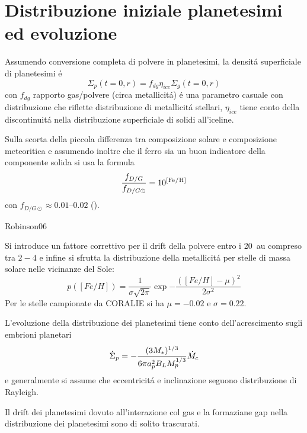 \section{Distribuzione iniziale planetesimi ed evoluzione}

Assumendo conversione completa di polvere in planetesimi, la densit\'a superficiale di planetesimi \'e
\begin{equation}
\Sigma_p(t=0,r)=f_{dg}\eta_{ice}\Sigma_g(t=0,r)
\end{equation}
con $f_{dg}$ rapporto gas/polvere (circa metallicit\'a) \'e una parametro casuale con distribuzione che riflette distribuzione di metallicit\'a stellari, $\eta_{ice}$ tiene conto della discontinuit\'a nella distribuzione superficiale di solidi all'iceline.

Sulla scorta della piccola differenza tra composizione solare e composizione meteoritica e assumendo inoltre che il ferro sia un buon indicatore della componente solida  si usa la formula
\begin{equation}
\frac{f_{D/G}}{f_{D/G\odot}}=10\expy{[\cel{Fe}{}{}{}/\cel{H}{}{}{}]}
\end{equation}
con $f_{D/G\odot}\approx\numrange{0.01}{0.02}$ (\cite{lodders2003solar}).

\begin{workout}
Robinson06
\end{workout}

Si introduce un fattore correttivo per il drift della polvere entro i \SI{20}{\astronomicalunit} compreso tra $2-4$ e infine si sfrutta la distribuzione della metallicit\'a per stelle di massa solare nelle vicinanze del Sole:
\begin{equation}
p([Fe/H])=\frac{1}{\sigma\sqrt{2\pi}}\exp{-\frac{([Fe/H]-\mu)^2}{2\sigma^2}}
\end{equation}
Per le stelle campionate da CORALIE si ha $\mu=-0.02$ e $\sigma=0.22$.

L'evoluzione della distribuzione dei planetesimi tiene conto dell'acrescimento sugli embrioni planetari
\begin{equation}\dot{\Sigma}_p=-\frac{(3M_*)^{1/3}}{6\pi a_p^2B_LM_p^{1/3}}\dot{M}_c\end{equation}
e generalmente si assume che eccentricit\'a e inclinazione seguono distribuzione di Rayleigh.

Il drift dei planetesimi dovuto all'interazione col gas e la formaziane gap nella distribuzione dei planetesimi sono di solito trascurati.


